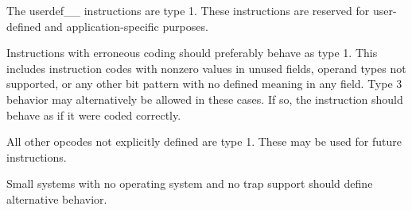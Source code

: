 \documentclass[forwardcom.tex]{subfiles}
\begin{document}
The userdef\_\_ instructions are type 1. These instructions are reserved for user-defined and application-specific purposes.
\vspace{2mm}

Instructions with erroneous coding should preferably behave as type 1. This includes instruction codes with nonzero values in unused fields, operand types not supported, or any other bit pattern with no defined meaning in any field. Type 3 behavior may alternatively be allowed in these cases. If so, the instruction should behave as if it were coded correctly.
\vspace{2mm}

All other opcodes not explicitly defined are type 1. These may be used for future instructions.
\vspace{2mm}

Small systems with no operating system and no trap support should define alternative behavior.

 
\end{document}
